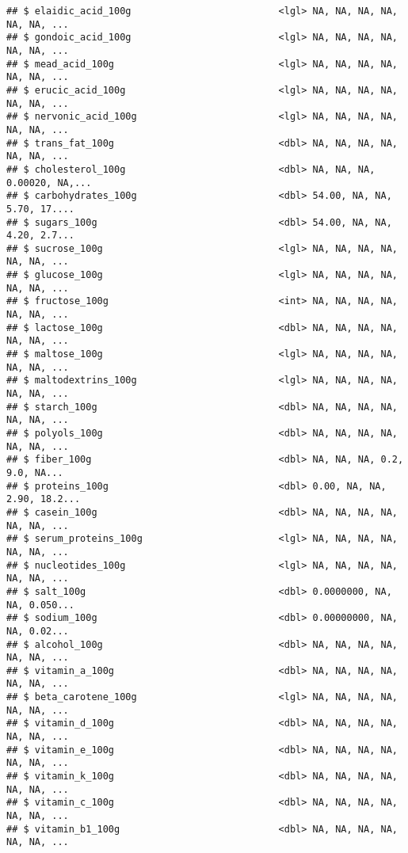 \documentclass[]{article}
\begin{document}
\begin{verbatim}
## $ elaidic_acid_100g                          <lgl> NA, NA, NA, NA, NA, NA, ...
## $ gondoic_acid_100g                          <lgl> NA, NA, NA, NA, NA, NA, ...
## $ mead_acid_100g                             <lgl> NA, NA, NA, NA, NA, NA, ...
## $ erucic_acid_100g                           <lgl> NA, NA, NA, NA, NA, NA, ...
## $ nervonic_acid_100g                         <lgl> NA, NA, NA, NA, NA, NA, ...
## $ trans_fat_100g                             <dbl> NA, NA, NA, NA, NA, NA, ...
## $ cholesterol_100g                           <dbl> NA, NA, NA, 0.00020, NA,...
## $ carbohydrates_100g                         <dbl> 54.00, NA, NA, 5.70, 17....
## $ sugars_100g                                <dbl> 54.00, NA, NA, 4.20, 2.7...
## $ sucrose_100g                               <lgl> NA, NA, NA, NA, NA, NA, ...
## $ glucose_100g                               <lgl> NA, NA, NA, NA, NA, NA, ...
## $ fructose_100g                              <int> NA, NA, NA, NA, NA, NA, ...
## $ lactose_100g                               <dbl> NA, NA, NA, NA, NA, NA, ...
## $ maltose_100g                               <lgl> NA, NA, NA, NA, NA, NA, ...
## $ maltodextrins_100g                         <lgl> NA, NA, NA, NA, NA, NA, ...
## $ starch_100g                                <dbl> NA, NA, NA, NA, NA, NA, ...
## $ polyols_100g                               <dbl> NA, NA, NA, NA, NA, NA, ...
## $ fiber_100g                                 <dbl> NA, NA, NA, 0.2, 9.0, NA...
## $ proteins_100g                              <dbl> 0.00, NA, NA, 2.90, 18.2...
## $ casein_100g                                <dbl> NA, NA, NA, NA, NA, NA, ...
## $ serum_proteins_100g                        <lgl> NA, NA, NA, NA, NA, NA, ...
## $ nucleotides_100g                           <lgl> NA, NA, NA, NA, NA, NA, ...
## $ salt_100g                                  <dbl> 0.0000000, NA, NA, 0.050...
## $ sodium_100g                                <dbl> 0.00000000, NA, NA, 0.02...
## $ alcohol_100g                               <dbl> NA, NA, NA, NA, NA, NA, ...
## $ vitamin_a_100g                             <dbl> NA, NA, NA, NA, NA, NA, ...
## $ beta_carotene_100g                         <lgl> NA, NA, NA, NA, NA, NA, ...
## $ vitamin_d_100g                             <dbl> NA, NA, NA, NA, NA, NA, ...
## $ vitamin_e_100g                             <dbl> NA, NA, NA, NA, NA, NA, ...
## $ vitamin_k_100g                             <dbl> NA, NA, NA, NA, NA, NA, ...
## $ vitamin_c_100g                             <dbl> NA, NA, NA, NA, NA, NA, ...
## $ vitamin_b1_100g                            <dbl> NA, NA, NA, NA, NA, NA, ...

\end{verbatim}
\end{document}
